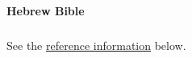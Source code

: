 			
			
		\paragraph{Hebrew Bible}
			\label{COVENANT-HEBREW}
		
			\subparagraph{\texorpdfstring{}{}}
				\label{BERIT} %
				
				See the \hyperref[COVENANT-reference]{reference information} below.
			
